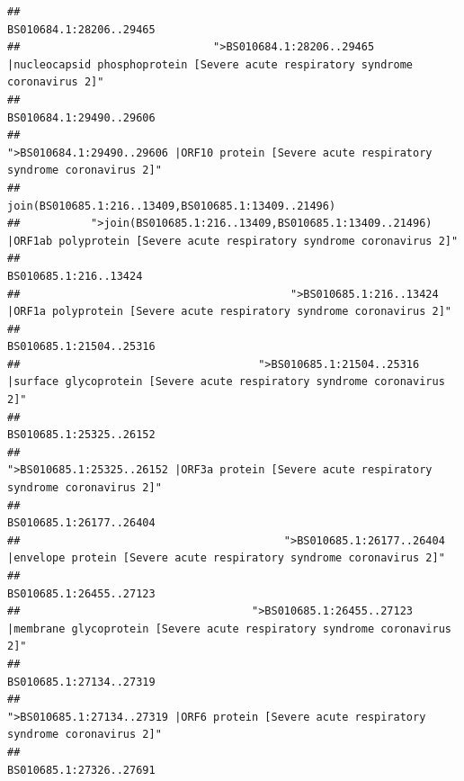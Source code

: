 \documentclass[
]{article}
\begin{document}
\begin{verbatim}
##                                                                                                                BS010684.1:28206..29465 
##                              ">BS010684.1:28206..29465 |nucleocapsid phosphoprotein [Severe acute respiratory syndrome coronavirus 2]" 
##                                                                                                                BS010684.1:29490..29606 
##                                            ">BS010684.1:29490..29606 |ORF10 protein [Severe acute respiratory syndrome coronavirus 2]" 
##                                                                                    join(BS010685.1:216..13409,BS010685.1:13409..21496) 
##           ">join(BS010685.1:216..13409,BS010685.1:13409..21496) |ORF1ab polyprotein [Severe acute respiratory syndrome coronavirus 2]" 
##                                                                                                                  BS010685.1:216..13424 
##                                          ">BS010685.1:216..13424 |ORF1a polyprotein [Severe acute respiratory syndrome coronavirus 2]" 
##                                                                                                                BS010685.1:21504..25316 
##                                     ">BS010685.1:21504..25316 |surface glycoprotein [Severe acute respiratory syndrome coronavirus 2]" 
##                                                                                                                BS010685.1:25325..26152 
##                                            ">BS010685.1:25325..26152 |ORF3a protein [Severe acute respiratory syndrome coronavirus 2]" 
##                                                                                                                BS010685.1:26177..26404 
##                                         ">BS010685.1:26177..26404 |envelope protein [Severe acute respiratory syndrome coronavirus 2]" 
##                                                                                                                BS010685.1:26455..27123 
##                                    ">BS010685.1:26455..27123 |membrane glycoprotein [Severe acute respiratory syndrome coronavirus 2]" 
##                                                                                                                BS010685.1:27134..27319 
##                                             ">BS010685.1:27134..27319 |ORF6 protein [Severe acute respiratory syndrome coronavirus 2]" 
##                                                                                                                BS010685.1:27326..27691 

\end{verbatim}
\end{document}
